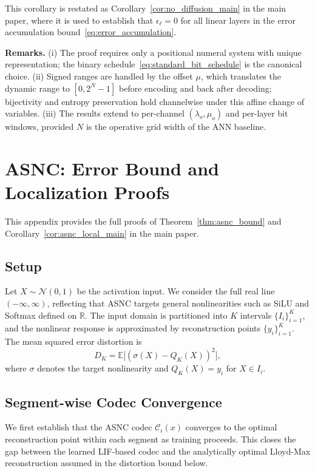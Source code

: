 \documentclass{article}
\theoremstyle{plain}
\theoremstyle{definition}
\theoremstyle{remark}
\begin{document}
This corollary is restated as Corollary~\ref{cor:no_diffusion_main} in the main
paper, where it is used to establish that $\epsilon_\ell = 0$ for all linear layers
in the error accumulation bound~\eqref{eq:error_accumulation}.

\noindent\textbf{Remarks.}
(i) The proof requires only a positional numeral system with unique representation;
the binary schedule~\eqref{eq:standard_bit_schedule} is the canonical choice.
(ii) Signed ranges are handled by the offset $\mu$, which translates the dynamic
range to $[0, 2^N-1]$ before encoding and back after decoding; bijectivity and
entropy preservation hold channelwise under this affine change of variables.
(iii) The results extend to per-channel $(\lambda_o, \mu_o)$ and per-layer bit
windows, provided $N$ is the operative grid width of the ANN baseline.


\section{ASNC: Error Bound and Localization Proofs}
\label{app:asnc_proof}

This appendix provides the full proofs of Theorem~\ref{thm:asnc_bound} and
Corollary~\ref{cor:asnc_local_main} in the main paper.

\subsection{Setup}

Let $X \sim \mathcal{N}(0,1)$ be the activation input. We consider the full real line
$(-\infty, \infty)$, reflecting that ASNC targets general nonlinearities such as SiLU
and Softmax defined on $\mathbb{R}$. The input domain is partitioned into $K$
intervals $\{I_i\}_{i=1}^K$, and the nonlinear response is approximated by
reconstruction points $\{y_i\}_{i=1}^K$. The mean squared error distortion is
\[
D_K = \mathbb{E}\big[(\sigma(X) - Q_K(X))^2\big],
\]
where $\sigma$ denotes the target nonlinearity and $Q_K(X) = y_i$ for $X \in I_i$.

\subsection{Segment-wise Codec Convergence}
\label{app:codec_convergence}

We first establish that the ASNC codec $\mathcal{C}_i(x)$ converges to the optimal
reconstruction point within each segment as training proceeds. This closes the gap
between the learned LIF-based codec and the analytically optimal Lloyd-Max
reconstruction assumed in the distortion bound below.
\end{document}
